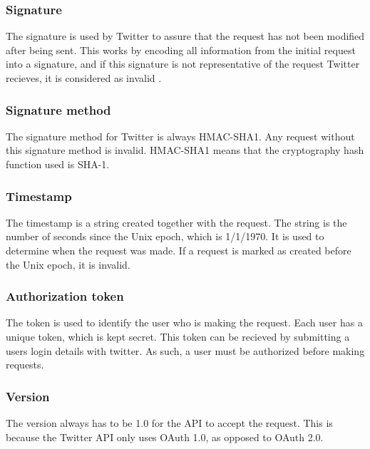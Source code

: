 \subsubsection*{Signature}
The signature is used by Twitter to assure that the request has not been
modified after being sent. This works by encoding all information from the
initial request into a signature, and if this signature is not representative of
the request Twitter recieves, it is considered as invalid
\citep[sec 3.4]{OAuth1}.

% 
 
\subsubsection*{Signature method}
The signature method for Twitter is always HMAC-SHA1. Any request without this
signature method is invalid. HMAC-SHA1 means that the cryptography hash function
used is \ac{SHA-1}.

\subsubsection*{Timestamp}
The timestamp is a string created together with the request. The string is the
number of seconds since the Unix epoch, which is 1/1/1970. It is used to
determine when the request was made.
If a request is marked as created before the Unix epoch, it is invalid.

\subsubsection*{Authorization token}
The token is used to identify the user who is making the request. Each user has
a unique token, which is kept secret. This token can be recieved by submitting a
users login details with twitter. As such, a user must be authorized before
making requests.


\subsubsection*{Version}
The version always has to be 1.0 for the API to accept the
request. This is because the Twitter \ac{API} only uses OAuth 1.0, as opposed to
OAuth 2.0.

